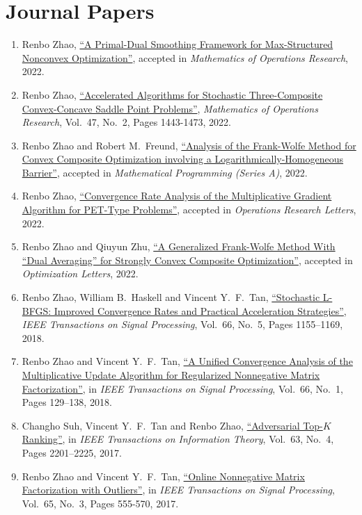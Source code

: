\documentclass[11pt]{article}
\newcommand{\TSP}{IEEE Transactions on Signal Processing}
\newcommand{\TIT}{IEEE Transactions on Information Theory}
\newcommand{\MOR}{Mathematics of Operations Research}
\newcommand{\MPA}{Mathematical Programming (Series A)}
\newcommand{\ORL}{Operations Research Letters}
\newcommand{\OPTL}{Optimization Letters}
\begin{document}

\section*{\large Journal Papers}

\begin{enumerate}[label=J\arabic*.]\setlength{\leftskip}{2ex}
\item Renbo Zhao, \href{https://arxiv.org/abs/2003.04375}{``A Primal-Dual Smoothing Framework for Max-Structured Nonconvex Optimization''}, accepted in  {\em \MOR}, 2022. 
\item {Renbo Zhao},  \href{https://pubsonline.informs.org/doi/abs/10.1287/moor.2021.1175?journalCode=moor}{``Accelerated Algorithms for Stochastic Three-Composite Convex-Concave Saddle Point Problems''},  {\em \MOR}, Vol.\ 47, No.\ 2, Pages 1443-1473, 2022.
\item Renbo Zhao and Robert M.\ Freund,  \href{https://link.springer.com/article/10.1007/s10107-022-01820-9}{``Analysis of the Frank-Wolfe Method for Convex Composite Optimization involving a Logarithmically-Homogeneous Barrier''},  accepted in {\em \MPA}, 2022.
\item Renbo Zhao, \href{https://arxiv.org/abs/2109.05601}{``Convergence Rate Analysis of the Multiplicative Gradient Algorithm for PET-Type Problems''}, accepted in {\em \ORL}, 2022.
\item Renbo Zhao and Qiuyun Zhu, \href{https://link.springer.com/article/10.1007/s11590-022-01951-0}{``A Generalized Frank-Wolfe Method With “Dual Averaging” for Strongly Convex Composite Optimization''}, accepted in  {\em \OPTL}, 2022. 
\item {Renbo Zhao}, William B.\ Haskell and Vincent Y.\ F.\ Tan,  \href{https://ieeexplore.ieee.org/document/8219748}{``Stochastic L-BFGS: Improved Convergence Rates and Practical Acceleration Strategies''},    {\em \TSP}, Vol.\ 66, No.\ 5, Pages 1155–1169, 2018.
\item {Renbo Zhao} and Vincent Y.\ F.\ Tan,   \href{https://ieeexplore.ieee.org/document/8052526}{``A Unified Convergence Analysis of the Multiplicative Update Algorithm for Regularized Nonnegative Matrix Factorization''},  in {\em \TSP}, Vol.\ 66, No.\ 1, Pages 129–138, 2018.
\item Changho Suh, Vincent Y.\ F.\ Tan and {Renbo Zhao},   \href{https://ieeexplore.ieee.org/document/7835206}{``Adversarial Top-$K$ Ranking''},   in {\em \TIT}, Vol.\ 63, No.\ 4, Pages 2201–2225, 2017.
\item {Renbo Zhao} and Vincent Y.\ F.\ Tan,   \href{https://ieeexplore.ieee.org/document/7676413}{``Online Nonnegative Matrix Factorization with Outliers''},  in {\em \TSP}, Vol.\ 65, No.\ 3, Pages 555-570, 2017. 
\end{enumerate}
\end{document}
